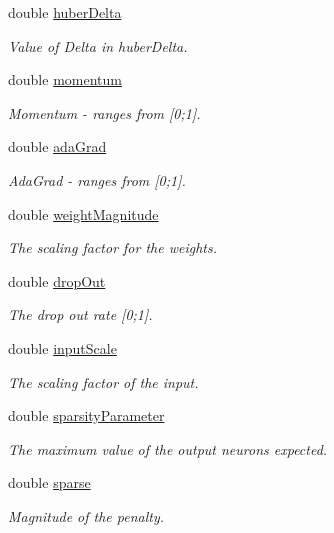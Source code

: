 \begin{DoxyCompactItemize}
double \hyperlink{classParamsInit_a587ab88af68e6f229c8c10642fafd455}{huber\+Delta}
\begin{DoxyCompactList}\small\item\em Value of Delta in huber\+Delta. \end{DoxyCompactList}\item 
double \hyperlink{classParamsInit_accff049590c6fb6e86cf2152e8c0a1b5}{momentum}
\begin{DoxyCompactList}\small\item\em Momentum -\/ ranges from \mbox{[}0;1\mbox{]}. \end{DoxyCompactList}\item 
double \hyperlink{classParamsInit_a1367327b42e60bab2e2ac1f1c74fb8ec}{ada\+Grad}
\begin{DoxyCompactList}\small\item\em Ada\+Grad -\/ ranges from \mbox{[}0;1\mbox{]}. \end{DoxyCompactList}\item 
double \hyperlink{classParamsInit_a2258ae5b7eb9489ca58421ac674e012b}{weight\+Magnitude}
\begin{DoxyCompactList}\small\item\em The scaling factor for the weights. \end{DoxyCompactList}\item 
double \hyperlink{classParamsInit_aa76f649c6aa95c27f13bc382d3ea46b7}{drop\+Out}
\begin{DoxyCompactList}\small\item\em The drop out rate \mbox{[}0;1\mbox{]}. \end{DoxyCompactList}\item 
double \hyperlink{classParamsInit_a39a3a45f1d0f32ddf55a302ae1c767ba}{input\+Scale}
\begin{DoxyCompactList}\small\item\em The scaling factor of the input. \end{DoxyCompactList}\item 
double \hyperlink{classParamsInit_aa065f164bd6831a5cc6ecb0ee5234466}{sparsity\+Parameter}
\begin{DoxyCompactList}\small\item\em The maximum value of the output neurons expected. \end{DoxyCompactList}\item 
double \hyperlink{classParamsInit_ab65c93afa1f704b359b25f90f81c1edc}{sparse}
\begin{DoxyCompactList}\small\item\em Magnitude of the penalty. \end{DoxyCompactList}\item 

\end{DoxyCompactItemize}
